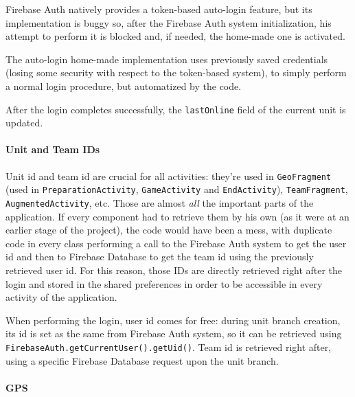 			Firebase Auth natively provides a token-based auto-login feature, but its implementation is buggy so, after the Firebase Auth system initialization, his attempt to perform it is blocked and, if needed, the home-made one is activated.
			
			The auto-login home-made implementation uses previously saved credentials (losing some security with respect to the token-based system), to simply perform a normal login procedure, but automatized by the code.
			
			After the login completes successfully, the \lstinline|lastOnline| field of the current unit is updated.
			
			\paragraph{Unit and Team IDs}
			
			Unit id and team id are crucial for all activities: they're used in \lstinline|GeoFragment| (used in \lstinline|PreparationActivity|, \lstinline|GameActivity| and \lstinline|EndActivity|), \lstinline|TeamFragment|, \lstinline|AugmentedActivity|, etc. Those are almost \emph{all} the important parts of the application.
			If every component had to retrieve them by his own (as it were at an earlier stage of the project), the code would have been a mess, with duplicate code in every class performing a call to the Firebase Auth system to get the user id and then to Firebase Database to get the team id using the previously retrieved user id.
			For this reason, those IDs are directly retrieved right after the login and stored in the shared preferences in order to be accessible in every activity of the application.
			
			When performing the login, user id comes for free: during unit branch creation, its id is set as the same from Firebase Auth system, so it can be retrieved using \lstinline|FirebaseAuth.getCurrentUser().getUid()|.
			Team id is retrieved right after, using a specific Firebase Database request upon the unit branch.
			
			\paragraph{GPS}
			

